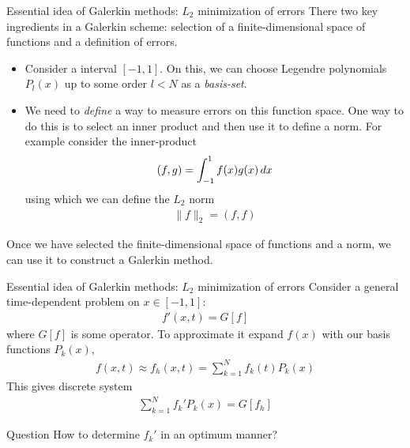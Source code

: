 \documentclass[aspectratio=169]{beamer}
\newcommand{\mypause}{\pause}
\begin{document}
\begin{frame}{Essential idea of Galerkin methods: $L_2$ minimization
    of errors}
  \small%
  There two key ingredients in a Galerkin scheme: selection of a
  finite-dimensional space of functions and a definition of errors.
  \mypause%

  \begin{itemize}\small
  \item Consider a interval $[-1,1]$. On this, we can choose Legendre
    polynomials $P_l(x)$ up to some order $l<N$ as a \emph{basis-set}.
  \item We need to \emph{define} a way to measure errors on this
    function space. One way to do this is to select an inner product
    and then use it to define a norm. For example consider the
    inner-product
    \begin{align*}
      (f,g) = \int_{-1}^1 f(x) g(x) \thinspace dx
    \end{align*}
    using which we can define the $L_2$ norm
    \begin{align*}
      \| f \|_2 = (f, f)
    \end{align*}
  \end{itemize}
  Once we have selected the finite-dimensional space of functions and
  a norm, we can use it to construct a Galerkin method.
  
\end{frame}


\begin{frame}{Essential idea of Galerkin methods: $L_2$ minimization
    of errors}
  \small
  Consider a general time-dependent problem on $x\in [-1,1]$:
  \begin{align*}
    f'(x,t) = G[f]
  \end{align*}
  where $G[f]$ is some operator. To approximate it expand $f(x)$ with
  our basis functions $P_k(x)$,
  \begin{align*}
    f(x,t) \approx f_h(x,t)  = \sum_{k=1}^N f_k(t) P_k(x)
  \end{align*}
  This gives discrete system
  \begin{align*}
    \sum_{k=1}^N f_k' P_k(x) = G[f_h]
  \end{align*}
  \mypause
  \begin{block}{Question}
    How to determine $f_k'$ in an optimum manner?
  \end{block}
  
\end{frame}
\end{document}

